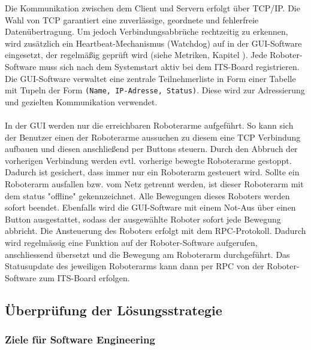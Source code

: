 Die Kommunikation zwischen dem Client und Servern erfolgt über TCP/IP. Die Wahl von TCP garantiert eine zuverlässige, geordnete und fehlerfreie Datenübertragung. Um jedoch Verbindungsabbrüche rechtzeitig zu erkennen, wird zusätzlich ein Heartbeat-Mechanismus (Watchdog) auf in der GUI-Software eingesetzt, der regelmäßig geprüft wird (siehe Metriken, Kapitel 
). Jede Roboter-Software muss sich nach dem Systemstart aktiv bei dem ITS-Board registrieren. Die GUI-Software verwaltet eine zentrale Teilnehmerliste in Form einer Tabelle mit Tupeln der Form \texttt{(Name, IP-Adresse, Status)}. Diese wird zur Adressierung und gezielten Kommunikation verwendet. %
\\\\
In der GUI werden nur die erreichbaren Roboterarme aufgeführt. So kann sich der Benutzer einen der Roboterarme aussuchen zu diesem eine TCP Verbindung aufbauen und diesen anschließend per Buttons steuern. Durch den Abbruch der vorherigen Verbindung werden evtl. vorherige bewegte Roboterarme gestoppt. Dadurch ist gesichert, dass immer nur ein Roboterarm gesteuert wird. Sollte ein Roboterarm ausfallen bzw. vom Netz getrennt werden, ist dieser Roboterarm mit dem status "offline" gekennzeichnet. Alle Bewegungen dieses Roboters werden sofort beendet. Ebenfalls wird die GUI-Software mit einem Not-Aus über einen Button ausgestattet, sodass der ausgewählte Roboter sofort jede Bewegung abbricht. Die Ansteuerung des Roboters erfolgt mit dem RPC-Protokoll. Dadurch wird regelmässig eine Funktion auf der Roboter-Software aufgerufen, anschliessend übersetzt und die Bewegung am Roboterarm durchgeführt. Das Statusupdate des jeweiligen Roboterarms kann dann per RPC von der Roboter-Software zum ITS-Board erfolgen.


\subsection*{Überprüfung der Lösungsstrategie}
\subsubsection*{Ziele für Software Engineering}

